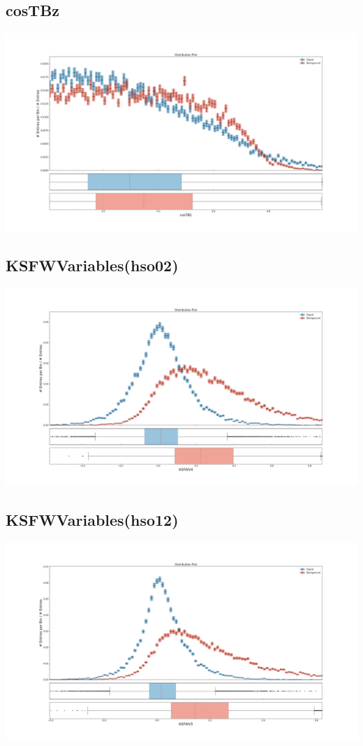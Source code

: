 \documentclass[10pt,a4paper]{article}
\begin{document}
\subsection{cosTBz}
\begin{center}
\includegraphics[width=1.0\textwidth]{variable_-8159988092516367488.pdf}
\end{center}
\subsection{KSFWVariables(hso02)}
\begin{center}
\includegraphics[width=1.0\textwidth]{variable_-7943577522924452898.pdf}
\end{center}
\subsection{KSFWVariables(hso12)}
\begin{center}
\includegraphics[width=1.0\textwidth]{variable_6035242278278920303.pdf}
\end{center}
\end{document}
